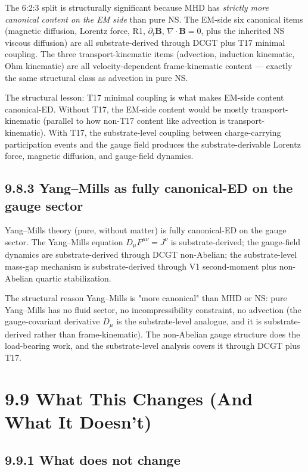 \documentclass[11pt]{book}
\begin{document}
The 6:2:3 split is structurally significant because MHD has \textit{strictly more canonical content on the EM side} than pure NS. The EM-side six canonical items (magnetic diffusion, Lorentz force, R1, $\partial_t\mathbf{B}$, $\nabla\cdot\mathbf{B} = 0$, plus the inherited NS viscous diffusion) are all substrate-derived through DCGT plus T17 minimal coupling. The three transport-kinematic items (advection, induction kinematic, Ohm kinematic) are all velocity-dependent frame-kinematic content — exactly the same structural class as advection in pure NS.

The structural lesson: T17 minimal coupling is what makes EM-side content canonical-ED. Without T17, the EM-side content would be mostly transport-kinematic (parallel to how non-T17 content like advection is transport-kinematic). With T17, the substrate-level coupling between charge-carrying participation events and the gauge field produces the substrate-derivable Lorentz force, magnetic diffusion, and gauge-field dynamics.

\subsection{9.8.3 Yang–Mills as fully canonical-ED on the gauge sector}

Yang–Mills theory (pure, without matter) is fully canonical-ED on the gauge sector. The Yang–Mills equation $D_\mu F^{\mu\nu} = J^\nu$ is substrate-derived; the gauge-field dynamics are substrate-derived through DCGT non-Abelian; the substrate-level mass-gap mechanism is substrate-derived through V1 second-moment plus non-Abelian quartic stabilization.

The structural reason Yang–Mills is "more canonical" than MHD or NS: pure Yang–Mills has no fluid sector, no incompressibility constraint, no advection (the gauge-covariant derivative $D_\mu$ is the substrate-level analogue, and it is substrate-derived rather than frame-kinematic). The non-Abelian gauge structure does the load-bearing work, and the substrate-level analysis covers it through DCGT plus T17.

\section{9.9 What This Changes (And What It Doesn't)}

\subsection{9.9.1 What does not change}
\end{document}
